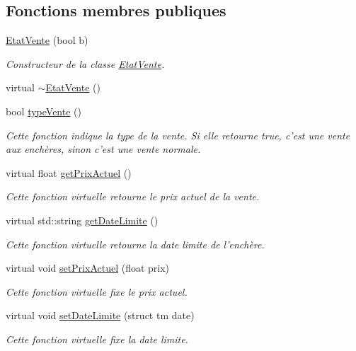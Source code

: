 \subsection*{Fonctions membres publiques}
\begin{DoxyCompactItemize}
\item 
\hyperlink{class_etat_vente_a6b2788e1edd74d8051623e966c5400a1}{Etat\-Vente} (bool b)
\begin{DoxyCompactList}\small\item\em Constructeur de la classe \hyperlink{class_etat_vente}{Etat\-Vente}. \end{DoxyCompactList}\item 
virtual \hyperlink{class_etat_vente_aace2ed3063f41ff36bddc3c09c024424}{$\sim$\-Etat\-Vente} ()
\item 
bool \hyperlink{class_etat_vente_acecfe3b215062d9a835831989e420ccd}{type\-Vente} ()
\begin{DoxyCompactList}\small\item\em Cette fonction indique la type de la vente. Si elle retourne true, c'est une vente aux enchères, sinon c'est une vente normale. \end{DoxyCompactList}\item 
virtual float \hyperlink{class_etat_vente_a0e797a253bbfe990d22f3d2827c8a318}{get\-Prix\-Actuel} ()
\begin{DoxyCompactList}\small\item\em Cette fonction virtuelle retourne le prix actuel de la vente. \end{DoxyCompactList}\item 
virtual std\-::string \hyperlink{class_etat_vente_ab466d257671a59ec97ae393c80226b7a}{get\-Date\-Limite} ()
\begin{DoxyCompactList}\small\item\em Cette fonction virtuelle retourne la date limite de l'enchère. \end{DoxyCompactList}\item 
virtual void \hyperlink{class_etat_vente_a8436bb978172c8e136fa349706baef0d}{set\-Prix\-Actuel} (float prix)
\begin{DoxyCompactList}\small\item\em Cette fonction virtuelle fixe le prix actuel. \end{DoxyCompactList}\item 
virtual void \hyperlink{class_etat_vente_a8efa95982f7252801512df1ea16faeeb}{set\-Date\-Limite} (struct tm date)
\begin{DoxyCompactList}\small\item\em Cette fonction virtuelle fixe la date limite. \end{DoxyCompactList}\end{DoxyCompactItemize}
